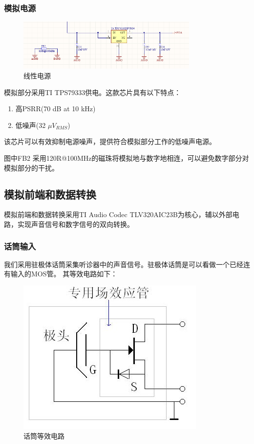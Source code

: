 \documentclass[16pt,a4paper]{article}
\begin{document}
\subsubsection{模拟电源}
\begin{figure}[H]
\centering
\includegraphics[width=0.8\textwidth]{power2.png}
\caption{线性电源} 
\end{figure}
模拟部分采用TI TPS79333供电。这款芯片具有以下特点：

\begin{enumerate}
\item 高PSRR(70 dB at 10 kHz)
\item 低噪声(32 $\mu V_{RMS}$)
\end{enumerate}\par
该芯片可以有效抑制电源噪声，提供符合模拟部分工作的低噪声电源。\par
图中FB2 采用120R@100MHz的磁珠将模拟地与数字地相连，可以避免数字部分对模拟部分的干扰。
\subsection{模拟前端和数据转换}
模拟前端和数据转换采用TI Audio Codec TLV320AIC23B为核心，辅以外部电路，实现声音信号和数字信号的双向转换。

\subsubsection{话筒输入}

我们采用驻极体话筒采集听诊器中的声音信号。驻极体话筒是可以看做一个已经连有输入的MOS管。
其等效电路如下：

\begin{figure}[H]
\centering
\includegraphics[scale = 0.5]{mic.jpg}
\caption{话筒等效电路} 
\end{figure}
\end{document}
